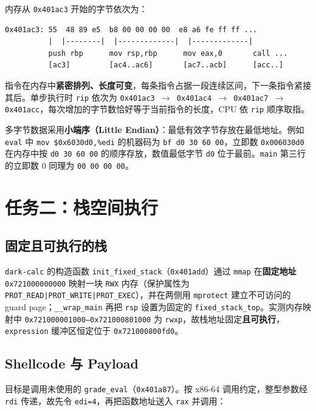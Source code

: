 \documentclass[11pt,a4paper]{article}
\begin{document}
内存从 \texttt{0x401ac3} 开始的字节依次为：

\begin{lstlisting}
0x401ac3: 55  48 89 e5  b8 00 00 00 00  e8 a6 fe ff ff ...
          |  |--------|  |-------------|  |-------------|
          push rbp      mov rsp,rbp      mov eax,0       call ...
          [ac3]         [ac4..ac6]       [ac7..acb]      [acc..]
\end{lstlisting}

指令在内存中\textbf{紧密排列、长度可变}，每条指令占据一段连续区间，下一条指令紧接其后。单步执行时 \texttt{rip} 依次为 \texttt{0x401ac3 $\to$ 0x401ac4 $\to$ 0x401ac7 $\to$ 0x401acc}，每次增加的字节数恰好等于当前指令的长度，CPU 依 \texttt{rip} 顺序取指。

多字节数据采用\textbf{小端序（Little Endian）}：最低有效字节存放在最低地址。例如 \texttt{eval} 中 \texttt{mov \$0x6030d0,\%edi} 的机器码为 \texttt{bf d0 30 60 00}，立即数 \texttt{0x006030d0} 在内存中按 \texttt{d0 30 60 00} 的顺序存放，数值最低字节 \texttt{d0} 位于最前。\texttt{main} 第三行的立即数 0 同理为 \texttt{00 00 00 00}。

\section{任务二：栈空间执行}

\subsection{固定且可执行的栈}

\texttt{dark-calc} 的构造函数 \texttt{init\_fixed\_stack}（\texttt{0x401add}）通过 \texttt{mmap} 在\textbf{固定地址} \texttt{0x721000000000} 映射一块 \texttt{RWX} 内存（保护属性为 \texttt{PROT\_READ|PROT\_WRITE|PROT\_EXEC}），并在两侧用 \texttt{mprotect} 建立不可访问的 guard page；\texttt{\_\_wrap\_main} 再把 \texttt{rsp} 设置为固定的 \texttt{fixed\_stack\_top}。实测内存映射中 \texttt{0x721000001000--0x721000801000} 为 \texttt{rwxp}，故栈地址固定\textbf{且可执行}，\texttt{expression} 缓冲区恒定位于 \texttt{0x721000800fd0}。

\subsection{Shellcode 与 Payload}

目标是调用未使用的 \texttt{grade\_eval}（\texttt{0x401a87}）。按 x86-64 调用约定，整型参数经 \texttt{rdi} 传递，故先令 \texttt{edi=4}，再把函数地址送入 \texttt{rax} 并调用：
\end{document}
